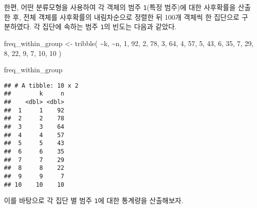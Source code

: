 \documentclass[
]{book}
\newenvironment{Shaded}{\begin{snugshade}}{\end{snugshade}}
\newcommand{\DecValTok}[1]{\textcolor[rgb]{0.00,0.00,0.81}{#1}}
\newcommand{\FunctionTok}[1]{\textcolor[rgb]{0.00,0.00,0.00}{#1}}
\newcommand{\NormalTok}[1]{#1}
\newcommand{\OtherTok}[1]{\textcolor[rgb]{0.56,0.35,0.01}{#1}}
\newcommand{\SpecialCharTok}[1]{\textcolor[rgb]{0.00,0.00,0.00}{#1}}
\begin{document}
한편, 어떤 분류모형을 사용하여 각 객체의 범주 \texttt{1}(특정 범주)에 대한 사후확률을 산출한 후, 전체 객체를 사후확률의 내림차순으로 정렬한 뒤 100개 객체씩 한 집단으로 구분하였다. 각 집단에 속하는 범주 \texttt{1}의 빈도는 다음과 같았다.

\begin{Shaded}
\begin{Highlighting}[]
\NormalTok{freq\_within\_group }\OtherTok{\textless{}{-}} \FunctionTok{tribble}\NormalTok{(}
  \SpecialCharTok{\textasciitilde{}}\NormalTok{k, }\SpecialCharTok{\textasciitilde{}}\NormalTok{n,}
  \DecValTok{1}\NormalTok{, }\DecValTok{92}\NormalTok{,}
  \DecValTok{2}\NormalTok{, }\DecValTok{78}\NormalTok{,}
  \DecValTok{3}\NormalTok{, }\DecValTok{64}\NormalTok{,}
  \DecValTok{4}\NormalTok{, }\DecValTok{57}\NormalTok{,}
  \DecValTok{5}\NormalTok{, }\DecValTok{43}\NormalTok{,}
  \DecValTok{6}\NormalTok{, }\DecValTok{35}\NormalTok{,}
  \DecValTok{7}\NormalTok{, }\DecValTok{29}\NormalTok{,}
  \DecValTok{8}\NormalTok{, }\DecValTok{22}\NormalTok{,}
  \DecValTok{9}\NormalTok{, }\DecValTok{7}\NormalTok{,}
  \DecValTok{10}\NormalTok{, }\DecValTok{10}
\NormalTok{)}

\NormalTok{freq\_within\_group}
\end{Highlighting}
\end{Shaded}

\begin{verbatim}
## # A tibble: 10 x 2
##        k     n
##    <dbl> <dbl>
##  1     1    92
##  2     2    78
##  3     3    64
##  4     4    57
##  5     5    43
##  6     6    35
##  7     7    29
##  8     8    22
##  9     9     7
## 10    10    10
\end{verbatim}

이를 바탕으로 각 집단 별 범주 \texttt{1}에 대한 통계량을 산출해보자.
\end{document}
